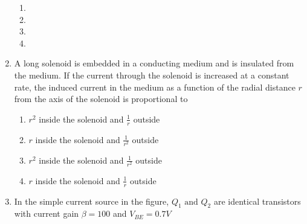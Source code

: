 \documentclass[journal]{IEEEtran}
\begin{document}
\begin{enumerate}
\begin{figure}[!ht]
\label{fig:my_label}
\end{figure}
\begin{multicols}{2}
\begin{enumerate}
   \item 
  \item 
   \columnbreak
    \item  
   \item {}%
      
    
\end{enumerate}
    
\end{multicols}


\item A long solenoid is embedded in a conducting medium and is insulated from the medium. If the current through the solenoid is increased at a constant rate, the induced current in the medium as a function of the radial distance $r$ from the axis of the solenoid is proportional to
\begin{multicols}{2}
\begin{enumerate}
    \item $r^2$ inside the solenoid and $\frac{1}{r}$ outside
    \item $r$ inside the solenoid and $\frac{1}{r^2}$ outside
 \item $r^2$ inside the solenoid and $\frac{1}{r^2}$ outside
  \item $r$ inside the solenoid and $\frac{1}{r}$ outside
\end{enumerate}
\end{multicols}
\item In the simple current source in the figure, $Q_1 \text{ and } Q_2$ are identical transistors with current gain $\beta = 100$ and $V_{BE} = 0.7 V$\\
\begin{figure}[!ht]
\centering
{}
\end{figure}
\end{enumerate}
\end{document}
